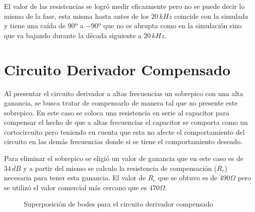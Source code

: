El valor de las resistencias se logró medir eficazmente pero no se puede decir lo mismo de la fase, esta misma hasta antes de los $20 \, kHz$ coincide con la simulada y tiene una caída de $90º$ a $-90º$ que no es abrupta como en la simulación sino que va bajando durante la década siguiente a $20 \, kHz$.





\section{Circuito Derivador Compensado}
Al presentar el circuito derivador a altas frecuencias un sobrepico con una alta ganancia, se busca tratar de compensarlo de manera tal que no presente este sobrepico.
En este caso se coloca una resistencia en serie al capacitor para compensar el hecho de que a altas frecuencias el capacitor se comporta como un cortocircuito pero teniendo en cuenta que esta no afecte el comportamiento del circuito en las demás frecuencias donde si se tiene el comportamiento deseado.

Para eliminar el sobrepico se eligió un valor de ganancia que en este caso es de $34 \, dB$ y a partir del mismo se calculo la resistencia de compensación ($R_c$) necesaria para tener esta ganancia. El valor de $R_c$ que se obtuvo es de $490 \Omega$ pero se utilizó el valor comercial más cercano que es $470 \Omega$.

\begin{figure}[H]
	\begin{center}
		\caption{Superposición de bodes para el circuito derivador compensado}
		\label{fig:superposicion3casosderivadorCOMPENSADO}
	\end{center}
\end{figure}

